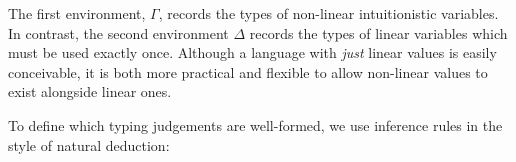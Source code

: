 \documentclass[]{unswthesis}
\newcommand{\types}{\vdash}
\let\c\texttt
\let\i\textit
\let\b\textbf
\begin{document}
The first environment, $\Gamma$, records the types of non-linear intuitionistic variables. In contrast, the second environment $\Delta$ records the types of linear variables which must be used exactly once. Although a language with \i{just} linear values is easily conceivable, it is both more practical and flexible to allow non-linear values to exist alongside linear ones.

To define which typing judgements are well-formed, we use inference rules in the style of natural deduction:






\end{document}
